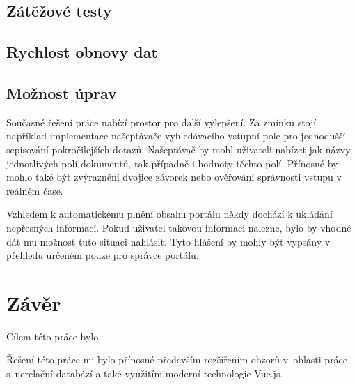 \section{Zátěžové testy}
\blindtext[2]

\section{Rychlost obnovy dat}
\blindtext[2]

\section{Možnost úprav}
Současné řešení práce nabízí prostor pro další vylepšení. Za zmínku stojí například implementace našeptávače vyhledávacího vstupní pole pro jednodušší sepisování pokročilejších dotazů. Našeptávač by mohl uživateli nabízet jak názvy jednotlivých polí dokumentů, tak případně i hodnoty těchto polí. Přínosné by mohlo také být zvýraznění dvojice závorek nebo ověřování správnosti vstupu v reálném čase.

Vzhledem k automatickému plnění obsahu portálu někdy dochází k ukládání nepřesných informací. Pokud uživatel takovou informaci nalezne, bylo by vhodné dát mu možnost tuto situaci nahlásit. Tyto hlášení by mohly být vypsány v přehledu určeném pouze pro správce portálu. 

\blindtext



\chapter{Závěr}
Cílem této práce bylo \blindtext

\blindtext %

Řešení této práce mi bylo přínosné především rozšířením obzorů v~oblasti práce s~nerelační databází a také využitím moderní technologie Vue.js.